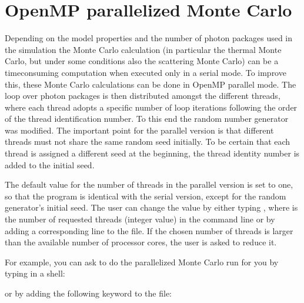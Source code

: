 \documentclass[letterpaper,10pt,english]{sphinxmanual}
\begin{document}
\section{OpenMP parallelized Monte Carlo}
\label{\detokenize{dustradtrans:openmp-parallelized-monte-carlo}}\label{\detokenize{dustradtrans:sec-omp-mc}}
Depending on the model properties and the number of photon packages used in
the simulation the Monte Carlo calculation (in particular the thermal Monte
Carlo, but under some conditions also the scattering Monte Carlo) can be a
time\sphinxhyphen{}consuming computation when executed only in a serial mode. To improve
this, these Monte Carlo calculations can be done in OpenMP parallel mode.
The loop over photon packages is then distributed amongst the different
threads, where each thread adopts a specific number of loop iterations
following the order of the thread identification number. To this end the
random number generator was modified. The important point for the parallel
version is that different threads must not share the same random seed
initially. To be certain that each thread is assigned a different seed at
the beginning, the thread identity number is added to the initial seed.

The default value for the number of threads in the parallel version is set to
one, so that the program is identical with the serial version, except for the
random generator’s initial seed. The user can change the value by either typing
, where  is the number of requested threads (integer
value) in the command line or by adding a corresponding line to the
 file. If the chosen number of threads is larger than the
available number of processor cores, the user is asked to reduce it.

For example, you can ask  to do the parallelized Monte
Carlo run for you by typing in a shell:

\begin{sphinxVerbatim}[commandchars=\\\{\}]
   
\end{sphinxVerbatim}

or by adding the following keyword to the  file:

\begin{sphinxVerbatim}[commandchars=\\\{\}]
  
\end{sphinxVerbatim}
\end{document}
